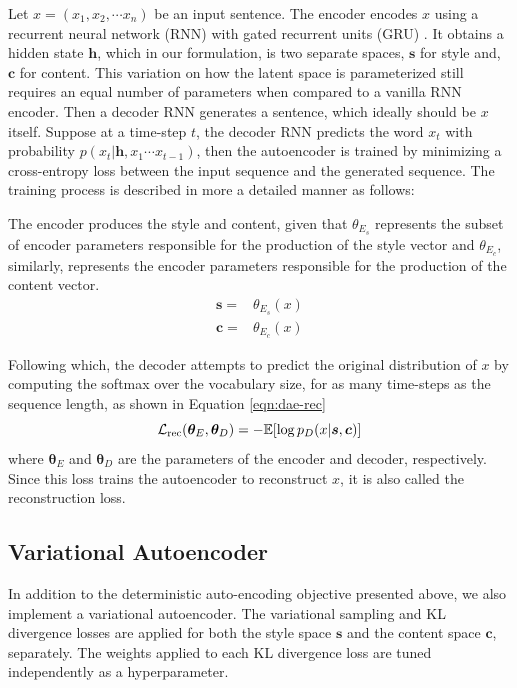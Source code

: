 Let $x=(x_1, x_2, \cdots x_n)$ be an input sentence. The encoder encodes $x$ using a recurrent neural network (RNN) with gated recurrent units (GRU) \citep{cho2014learning}. It obtains a hidden state $\bm h$, which in our formulation, is two separate spaces, $\bm s$ for style and, $\bm c$ for content. This variation on how the latent space is parameterized still requires an equal number of parameters when compared to a vanilla RNN encoder. Then a decoder RNN generates a sentence, which ideally should be $x$ itself. Suppose at a time-step $t$, the decoder RNN predicts the word $x_t$ with probability $p(x_t | \bm h, x_1 \cdots x_{t-1})$, then the autoencoder is trained by minimizing a cross-entropy loss between the input sequence and the generated sequence. The training process is described in more a detailed manner as follows:

The encoder produces the style and content, given that $\theta_{E_s}$ represents the subset of encoder parameters responsible for the production of the style vector and $\theta_{E_c}$, similarly, represents the encoder parameters responsible for the production of the content vector.
\begin{align*}
	\bm s =
	 & \theta_{E_s}(x) \nonumber \\
	\bm c =
	 & \theta_{E_c}(x) \nonumber
\end{align*}

Following which, the decoder attempts to predict the original distribution of $x$ by computing the softmax over the vocabulary size, for as many time-steps as the sequence length, as shown in Equation \ref{eqn:dae-rec}
\begin{equation} \label{eqn:dae-rec}
	\mathcal{L}_\text{rec}(\bm\theta_E,\bm\theta_D)= -\mathbb{E}[\log p_D(x|\bm s, \bm c)]
\end{equation}
where $\bm\theta_E$ and $\bm\theta_D$ are the parameters of the encoder and decoder, respectively. Since this loss trains the autoencoder to reconstruct $x$, it is also called the reconstruction loss.


\subsection{Variational Autoencoder}

In addition to the deterministic auto-encoding objective presented above, we also implement a variational autoencoder. The variational sampling and KL divergence losses are applied for both the style space $\bm s$ and the content space $\bm c$, separately. The weights applied to each KL divergence loss are tuned independently as a hyperparameter.


